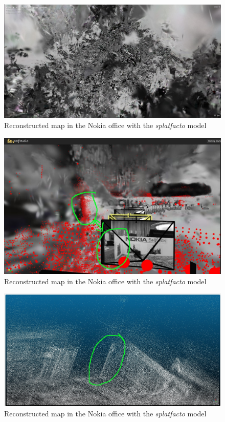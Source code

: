 \begin{figure}[htbp]
	\centering
	\includegraphics[width=150mm, keepaspectratio]{figures_jpg/nokia_splatfacto_ours2.jpg}
	\caption{Reconstructed map in the Nokia office with the \textit{splatfacto} model}
	\label{fig:nokia_splatfacto_ours_2}
\end{figure}

\begin{figure}[htbp]
	\centering
	\includegraphics[width=150mm, keepaspectratio]{figures_jpg/trajectory_and_pointcloud_debug.jpg}
	\caption{Reconstructed map in the Nokia office with the \textit{splatfacto} model}
	\label{fig:trajectory_and_pointcloud}
\end{figure}

\begin{figure}[htbp]
	\centering
	\includegraphics[width=150mm, keepaspectratio]{figures_jpg/pointcloud_debug.jpg}
	\caption{Reconstructed map in the Nokia office with the \textit{splatfacto} model}
	\label{fig:pointcloud_debug}
\end{figure}

